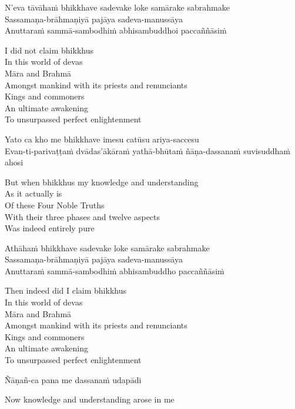 N’eva tāvāhaṁ bhikkhave sadevake loke samārake sabrahmake\\
Sassamaṇa-brāhmaṇiyā pajāya sadeva-manussāya\\
Anuttaraṁ sammā-sambodhiṁ abhisambuddhoi paccaññāsiṁ

\begin{cprenglish}
  I did not claim bhikkhus\\
  In this world of devas\\
  Māra and Brahmā\\
  Amongst mankind with its priests and renunciants\\
  Kings and commoners\\
  An ultimate awakening\\
  To unsurpassed perfect enlightenment
\end{cprenglish}

Yato ca kho me bhikkhave imesu catūsu ariya-saccesu\\
Evan-ti-parivaṭṭaṁ dvādas’ākāraṁ yathā-bhūtaṁ ñāṇa-dassanaṁ suvisuddhaṁ ahosi

\begin{cprenglish}
  But when bhikkhus my knowledge and understanding\\
  As it actually is\\
  Of these Four Noble Truths\\
  With their three phases and twelve aspects\\
  Was indeed entirely pure
\end{cprenglish}

Athāhaṁ bhikkhave sadevake loke samārake sabrahmake\\
Sassamaṇa-brāhmaṇiyā pajāya sadeva-manussāya\\
Anuttaraṁ sammā-sambodhiṁ abhisambuddho paccaññāsiṁ

\begin{cprenglish}
  Then indeed did I claim bhikkhus\\
  In this world of devas\\
  Māra and Brahmā\\
  Amongst mankind with its priests and renunciants\\
  Kings and commoners\\
  An ultimate awakening\\
  To unsurpassed perfect enlightenment
\end{cprenglish}

Ñāṇañ-ca pana me dassanaṁ udapādi

\begin{cprenglish}
  Now knowledge and understanding arose in me
\end{cprenglish}

